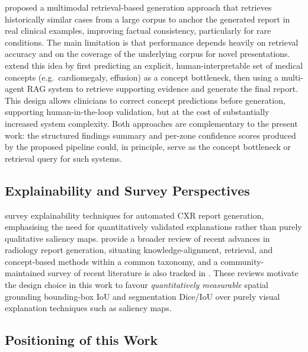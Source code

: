 \documentclass[preprint,12pt,authoryear]{elsarticle}
\begin{document}
\citet{xrem} proposed a multimodal retrieval-based generation approach that retrieves historically similar cases from a large corpus to anchor the generated report in real clinical examples, improving factual consistency, particularly for rare conditions. The main limitation is that performance depends heavily on retrieval accuracy and on the coverage of the underlying corpus for novel presentations. \citet{concept_rag} extend this idea by first predicting an explicit, human-interpretable set of medical concepts (e.g.\ cardiomegaly, effusion) as a concept bottleneck, then using a multi-agent RAG system to retrieve supporting evidence and generate the final report. This design allows clinicians to correct concept predictions before generation, supporting human-in-the-loop validation, but at the cost of substantially increased system complexity. Both approaches are complementary to the present work: the structured findings summary and per-zone confidence scores produced by the proposed pipeline could, in principle, serve as the concept bottleneck or retrieval query for such systems.

\subsection{Explainability and Survey Perspectives}

\citet{xai_survey} survey explainability techniques for automated CXR report generation, emphasising the need for quantitatively validated explanations rather than purely qualitative saliency maps. \citet{pmc_advancements} provide a broader review of recent advances in radiology report generation, situating knowledge-alignment, retrieval, and concept-based methods within a common taxonomy, and a community-maintained survey of recent literature is also tracked in \citet{awesome_rrg}. These reviews motivate the design choice in this work to favour \emph{quantitatively measurable} spatial grounding bounding-box IoU and segmentation Dice/IoU over purely visual explanation techniques such as saliency maps.

\subsection{Positioning of this Work}
\end{document}
